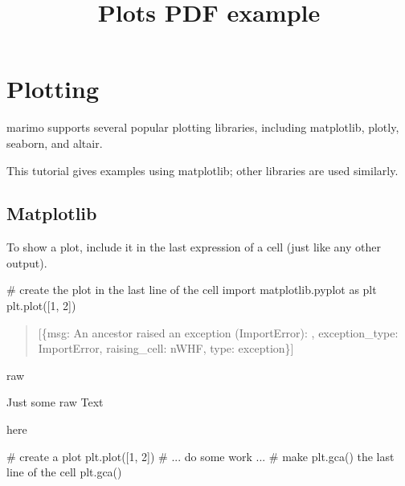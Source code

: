 \documentclass[
  letterpaper,
  DIV=11,
  numbers=noendperiod]{scrartcl}
\title{Plots PDF example}
\author{}
\date{}
\newenvironment{Shaded}{\begin{snugshade}}{\end{snugshade}}
\newcommand{\NormalTok}[1]{\textcolor[rgb]{0.00,0.23,0.31}{#1}}
\begin{document}
\maketitle

\section{Plotting}\label{plotting}

marimo supports several popular plotting libraries, including
matplotlib, plotly, seaborn, and altair.

This tutorial gives examples using matplotlib; other libraries are used
similarly.

\subsection{Matplotlib}\label{matplotlib}

To show a plot, include it in the last expression of a cell (just like
any other output).

\begin{Shaded}
\begin{Highlighting}[]
\NormalTok{\# create the plot in the last line of the cell}
\NormalTok{import matplotlib.pyplot as plt}
\NormalTok{plt.plot([1, 2])}
\end{Highlighting}
\end{Shaded}

\begin{quote}
{[}\{\textquotesingle msg\textquotesingle: \textquotesingle An ancestor
raised an exception (ImportError): \textquotesingle,
\textquotesingle exception\_type\textquotesingle:
\textquotesingle ImportError\textquotesingle,
\textquotesingle raising\_cell\textquotesingle:
\textquotesingle nWHF\textquotesingle,
\textquotesingle type\textquotesingle:
\textquotesingle exception\textquotesingle\}{]}
\end{quote}

raw

Just some raw Text

here

\begin{Shaded}
\begin{Highlighting}[]
\NormalTok{\# create a plot}
\NormalTok{plt.plot([1, 2])}
\NormalTok{\# ... do some work ...}
\NormalTok{\# make plt.gca() the last line of the cell}
\NormalTok{plt.gca()}
\end{Highlighting}
\end{Shaded}
\end{document}
